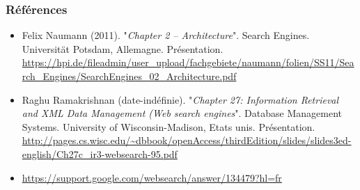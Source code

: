 \documentclass[xcolor=table]{beamer}
\begin{document}
\begin{frame}
\frametitle{Références}

\tiny

\begin{itemize}
	\item Felix Naumann (2011). 
	"\textit{Chapter 2 – Architecture}". 
	Search Engines. 
	Universität Potsdam, Allemagne. Présentation.
	\url{https://hpi.de/fileadmin/user_upload/fachgebiete/naumann/folien/SS11/Search_Engines/SearchEngines_02_Architecture.pdf}
	
	\item Raghu Ramakrishnan (date-indéfinie).
	"\textit{Chapter 27: Information Retrieval and XML Data Management (Web search engines}". 
	Database Management Systems. 
	University of Wisconsin-Madison, Etats unis. Présentation.
	\url{http://pages.cs.wisc.edu/~dbbook/openAccess/thirdEdition/slides/slides3ed-english/Ch27c_ir3-websearch-95.pdf}
	
	\item \url{https://support.google.com/websearch/answer/134479?hl=fr}
	
\end{itemize}

\end{frame}

%
% 
\end{document}
